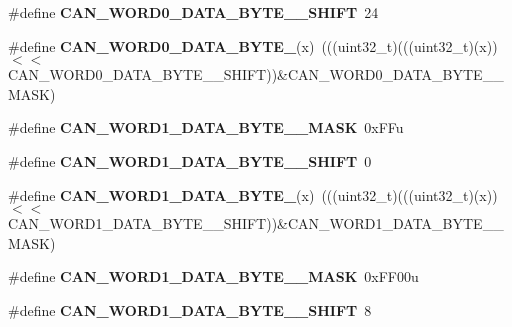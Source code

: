 \begin{DoxyCompactItemize}
\item 
\#define {\bfseries C\+A\+N\+\_\+\+W\+O\+R\+D0\+\_\+\+D\+A\+T\+A\+\_\+\+B\+Y\+T\+E\+\_\+\_\+\+S\+H\+I\+FT}~24\hypertarget{group__CAN__Register__Masks_gaf84582fa0ea01d047081e02025634145}{}\label{group__CAN__Register__Masks_gaf84582fa0ea01d047081e02025634145}

\item 
\#define {\bfseries C\+A\+N\+\_\+\+W\+O\+R\+D0\+\_\+\+D\+A\+T\+A\+\_\+\+B\+Y\+T\+E\+\_}(x)~(((uint32\+\_\+t)(((uint32\+\_\+t)(x))$<$$<$C\+A\+N\+\_\+\+W\+O\+R\+D0\+\_\+\+D\+A\+T\+A\+\_\+\+B\+Y\+T\+E\+\_\+\_\+\+S\+H\+I\+FT))\&C\+A\+N\+\_\+\+W\+O\+R\+D0\+\_\+\+D\+A\+T\+A\+\_\+\+B\+Y\+T\+E\+\_\+\_\+\+M\+A\+SK)\hypertarget{group__CAN__Register__Masks_ga3deb5bd24c168fa54bd47f0ad12d7873}{}\label{group__CAN__Register__Masks_ga3deb5bd24c168fa54bd47f0ad12d7873}

\item 
\#define {\bfseries C\+A\+N\+\_\+\+W\+O\+R\+D1\+\_\+\+D\+A\+T\+A\+\_\+\+B\+Y\+T\+E\+\_\+\_\+\+M\+A\+SK}~0x\+F\+Fu\hypertarget{group__CAN__Register__Masks_ga55f9bc8ccdbb2f34f1b571eff8481537}{}\label{group__CAN__Register__Masks_ga55f9bc8ccdbb2f34f1b571eff8481537}

\item 
\#define {\bfseries C\+A\+N\+\_\+\+W\+O\+R\+D1\+\_\+\+D\+A\+T\+A\+\_\+\+B\+Y\+T\+E\+\_\+\_\+\+S\+H\+I\+FT}~0\hypertarget{group__CAN__Register__Masks_gacff5d21eb80fe537f40b518e58750186}{}\label{group__CAN__Register__Masks_gacff5d21eb80fe537f40b518e58750186}

\item 
\#define {\bfseries C\+A\+N\+\_\+\+W\+O\+R\+D1\+\_\+\+D\+A\+T\+A\+\_\+\+B\+Y\+T\+E\+\_}(x)~(((uint32\+\_\+t)(((uint32\+\_\+t)(x))$<$$<$C\+A\+N\+\_\+\+W\+O\+R\+D1\+\_\+\+D\+A\+T\+A\+\_\+\+B\+Y\+T\+E\+\_\+\_\+\+S\+H\+I\+FT))\&C\+A\+N\+\_\+\+W\+O\+R\+D1\+\_\+\+D\+A\+T\+A\+\_\+\+B\+Y\+T\+E\+\_\+\_\+\+M\+A\+SK)\hypertarget{group__CAN__Register__Masks_gaf1fd0b43601dbb20b700e6bbe828712a}{}\label{group__CAN__Register__Masks_gaf1fd0b43601dbb20b700e6bbe828712a}

\item 
\#define {\bfseries C\+A\+N\+\_\+\+W\+O\+R\+D1\+\_\+\+D\+A\+T\+A\+\_\+\+B\+Y\+T\+E\+\_\+\_\+\+M\+A\+SK}~0x\+F\+F00u\hypertarget{group__CAN__Register__Masks_ga2a3649044e37e695317cff5b42d9c4f1}{}\label{group__CAN__Register__Masks_ga2a3649044e37e695317cff5b42d9c4f1}

\item 
\#define {\bfseries C\+A\+N\+\_\+\+W\+O\+R\+D1\+\_\+\+D\+A\+T\+A\+\_\+\+B\+Y\+T\+E\+\_\+\_\+\+S\+H\+I\+FT}~8\hypertarget{group__CAN__Register__Masks_gadfb68bcd398c238b56d716fa3a8ec4ee}{}\label{group__CAN__Register__Masks_gadfb68bcd398c238b56d716fa3a8ec4ee}


\end{DoxyCompactItemize}
